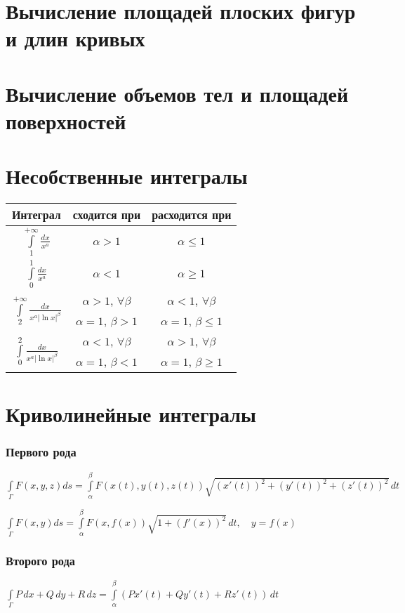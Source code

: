 \section{Вычисление площадей плоских фигур и длин кривых}



\section{Вычисление объемов тел и площадей поверхностей}

\section{Несобственные интегралы}
\footnotesize
\begin{longtable}{|c|c|c|}
\hline Интеграл & сходится при & расходится при 
\\\hline $\int\limits_{1}^{+\infty} \frac{dx}{x^a}$ 
& $\alpha > 1$
& $\alpha \le 1$
\\\hline $\int\limits_{0}^{1} \frac{dx}{x^a}$
& $\alpha < 1$
& $\alpha \ge 1$
\\\hline \multirow{2}{*}{$\int\limits_{2}^{+\infty} \frac{dx}{x^a |\ln x|^{\beta}}$}
& $\alpha > 1$, $\forall \beta$
& $\alpha < 1$, $\forall \beta$
\\\cline{2-3} 
& $\alpha = 1$, $\beta > 1$
& $\alpha = 1$, $\beta \le 1$
\\\hline \multirow{2}{*}{$\int\limits_{0}^{2} \frac{dx}{x^a |\ln x|^{\beta}}$}
& $\alpha < 1$, $\forall \beta$
& $\alpha > 1$, $\forall \beta$
\\\cline{2-3} 
& $\alpha = 1$, $\beta < 1$
& $\alpha = 1$, $\beta \ge 1$
\\\hline
\end{longtable}
\normalsize

\section{Криволинейные интегралы}
\subsubsection{Первого рода}
$\int\limits_{\Gamma} F(x,y,z) ds = \int\limits_{\alpha}^{\beta} F(x(t),y(t),z(t))\sqrt{(x'(t))^2+(y'(t))^2+(z'(t))^2}\,dt$

$\int\limits_{\Gamma} F(x,y) ds = \int\limits_{\alpha}^{\beta} F(x,f(x))\sqrt{1+(f'(x))^2}\,dt, \quad y=f(x)$

\subsubsection{Второго рода}
$\int\limits_{\Gamma} P\,dx+Q\,dy+R\,dz=\int\limits_{\alpha}^{\beta} \left(P x'(t)+ Q y'(t)+ R z'(t)\right)\,dt$

